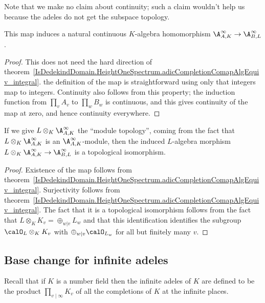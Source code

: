Note that we make no claim about continuity; such a claim wouldn't help
us because the adeles do not get the subspace topology.

\begin{theorem} This map induces a natural continuous $K$-algebra homomorphism
  $\A_{A,K}^\infty\to\A_{B,L}^\infty$.
  \label{DedekindDomain.FiniteAdeleRing.baseChange}
  \leanok
\end{theorem}
\begin{proof}
  This does not need the hard direction of
  theorem~\ref{IsDedekindDomain.HeightOneSpectrum.adicCompletionComapAlgEquiv_integral}.
  the definition of the map is straightforward using only that integers map
  to integers. Continuity also follows from this property; the induction function from
  $\prod_v A_v$ to $\prod_w B_w$ is continuous, and this gives continuity
  of the map at zero, and hence continuity everywhere.
\end{proof}

\begin{theorem}
  \label{DedekindDomain.FiniteAdeleRing.baseChangeEquiv}
  \leanok
  If we give $L\otimes_K\A_{A,K}^\infty$ the ``module topology'', coming from the fact
  that $L\otimes_K\A_{A,K}^\infty$ is an $\A_{A,K}^\infty$-module, then the induced
  $L$-algebra morphism
  $L\otimes_K\A_{A,K}^\infty\to\A_{B,L}^\infty$ is a topological isomorphism.
\end{theorem}
\begin{proof}
  Existence of the map follows from
  theorem~\ref{IsDedekindDomain.HeightOneSpectrum.adicCompletionComapAlgEquiv_integral}.
  Surjectivity follows from
  theorem~\ref{IsDedekindDomain.HeightOneSpectrum.adicCompletionComapAlgEquiv_integral}.
  The fact that it is a topological isomorphism follows from the fact that
  $L\otimes_K K_v=\oplus_{w|v}L_w$ and that this identification identifies
  the subgroup $\calO_L\otimes_K K_v$ with $\oplus_{w|v}\calO_{L_w}$ for all
  but finitely many $v$.
\end{proof}

\subsection{Base change for infinite adeles}

Recall that if $K$ is a number field then the infinite adeles of $K$ are defined
to be the product $\prod_{v\mid\infty} K_v$ of all the completions of $K$ at the
infinite places.

